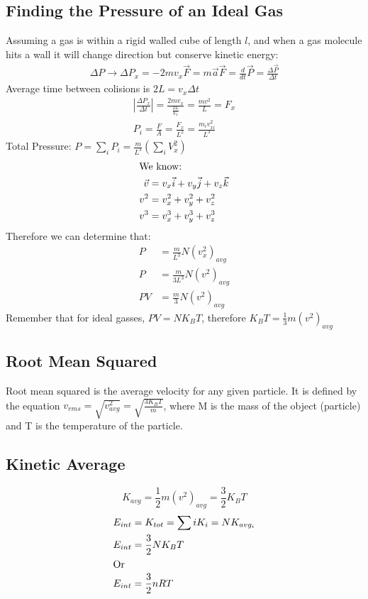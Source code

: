 	\subsection{Finding the Pressure of an Ideal Gas}
	Assuming a gas is within a rigid walled cube of length $l$, and when a gas molecule hits a wall it will change direction but conserve kinetic energy:
	\begin{align*}
	\Delta P \to \Delta P_x = -2mv_x
	\vec{F}=m\vec{a}
	\vec{F}=\frac{d}{dt}\vec{P} = \frac{\Delta \vec{P}}{\Delta t}
	\end{align*}
	Average time between colisions is $2L=v_x \Delta t$
	\begin{align*}
	\left|\frac{\Delta P_x}{\Delta t}\right| = \frac{2mv_x}{\frac{2L}{V_x}}=\frac{mv^2}{L}=F_x\\
	P_i=\frac{F}{A}=\frac{F_x}{L^2}=\frac{m_iv_{xi}^2}{L^3}
	\end{align*}
	Total Pressure: $P=\sum_{i}{P_i}=\frac{m}{L^3}(\sum_{i}V_x^2)$
	\begin{align*}
	\shortintertext{We know: } \vec{v}&=v_x\vec{i}+v_y\vec{j}+v_z\vec{k}\\
	v^2 &= v_x^2+v_y^2+v_z^2\\
	v^3 &= v_x^3+v_y^3+v_z^3
	\end{align*}
	Therefore we can determine that:
	\begin{align*}
	P &= \frac{m}{L^3}N(v_x^2)_{avg}\\
	P &= \frac{m}{3L^3}N(v^2)_{avg}\\
	PV &= \frac{m}{3}N(v^2)_{avg}
	\end{align*}
	Remember that for ideal gasses, $PV=NK_BT$, therefore  $K_BT=\frac{1}{3}m(v^2)_{avg}$
	\subsection{Root Mean Squared}
	Root mean squared is the average velocity for any given particle. It is defined by the equation $v_{rms}=\sqrt{v_{avg}^2}=\sqrt{\frac{3K_BT}{m}}$, where M is the mass of the object (particle) and T is the temperature of the particle.
	\subsection{Kinetic Average}
	\begin{equation*}
	K_{avg}=\frac{1}{2}m(v^2)_{avg}=\frac{3}{2}K_BT
	\end{equation*}
	\newline
	\begin{align*}
	E_{int}&=K_{tot}=\sum{i}K_i=NK_{avg_i}\\
	E_{int} &= \frac{3}{2}NK_BT\\
	\shortintertext{Or }E_{int}&=\frac{3}{2}nRT
	\end{align*}
